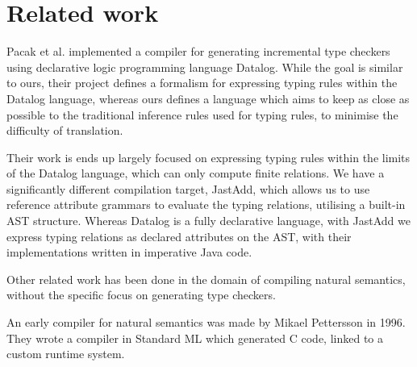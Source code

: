 \documentclass[nofilelist]{cslthse-msc}
\newcommand{\CR}[1]{\textcolor{green!60!black}{[\textbf{CR}:#1]}}
\begin{document}
\chapter{Related work} %
Pacak et al. implemented a compiler for generating incremental type checkers using declarative logic programming language Datalog\cite{Pacak}.
While the goal is similar to ours, their project defines a formalism for expressing typing rules within the Datalog language, whereas ours defines a language which aims to keep as close as possible to the traditional inference rules used for typing rules, to minimise the difficulty of translation.


Their work is ends up largely focused on expressing typing rules within the limits of the Datalog language, which can only compute finite relations.
We have a significantly different compilation target, JastAdd, which allows us to use reference attribute grammars to evaluate the typing relations, utilising a built-in AST structure.
Whereas Datalog is a fully declarative language, with JastAdd we express typing relations as declared attributes on the AST, with their implementations written in imperative Java code.

Other related work has been done in the domain of compiling natural semantics, without the specific focus on generating type checkers.

An early compiler for natural semantics was made by Mikael Pettersson in 1996\cite{Pettersson}.
They wrote a compiler in Standard ML which generated C code, linked to a custom runtime system.
\end{document}
